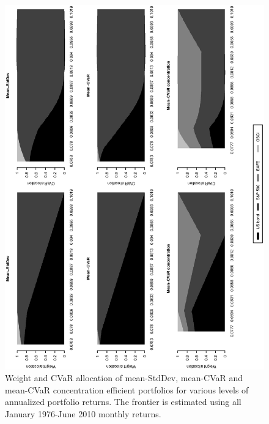 \documentclass[11pt]{article}
\begin{document}
\begin{figure}[tb]
\caption{Weight and CVaR allocation of mean-StdDev, mean-CVaR and mean-CVaR concentration efficient
portfolios for various levels of annualized portfolio returns. The frontier is  estimated using all January 1976-June 2010 monthly returns.  }
\includegraphics[width=12cm,angle=270]{stackedweightsriskcont_efficientfrontier.eps}
\end{figure}




\newpage
\end{document}
